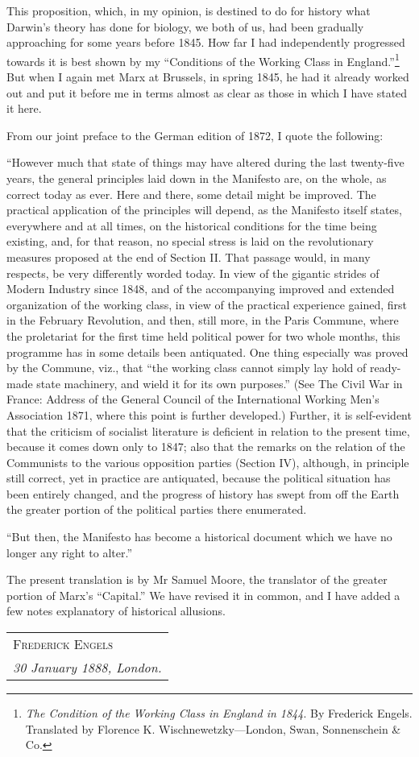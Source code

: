 This proposition, which, in my opinion, is destined to do for history what Darwin's theory has done for biology, we both of us, had been gradually approaching for some years before 1845. How far I had independently progressed towards it is best shown by my ``Conditions of the Working Class in England.''\footnote{\emph{The Condition of the Working Class in England in 1844}. By Frederick Engels. Translated by Florence K. Wischnewetzky—London, Swan, Sonnenschein \& Co.} But when I again met Marx at Brussels, in spring 1845, he had it already worked out and put it before me in terms almost as clear as those in which I have stated it here. 

From our joint preface to the German edition of 1872, I quote the following: 
\begin{displayquote}
``However much that state of things may have altered during the last twenty-five years, the general principles laid down in the Manifesto are, on the whole, as correct today as ever. Here and there, some detail might be improved. The practical application of the principles will depend, as the Manifesto itself states, everywhere and at all times, on the historical conditions for the time being existing, and, for that reason, no special stress is laid on the revolutionary measures proposed at the end of Section II. That passage would, in many respects, be very differently worded today. In view of the gigantic strides of Modern Industry since 1848, and of the accompanying improved and extended organization of the working class, in view of the practical experience gained, first in the February Revolution, and then, still more, in the Paris Commune, where the proletariat for the first time held political power for two whole months, this programme has in some details been antiquated. One thing especially was proved by the Commune, viz., that ``the working class cannot simply lay hold of ready-made state machinery, and wield it for its own purposes.'' (See The Civil War in France: Address of the General Council of the International Working Men's Association 1871, where this point is further developed.) Further, it is self-evident that the criticism of socialist literature is deficient in relation to the present time, because it comes down only to 1847; also that the remarks on the relation of the Communists to the various opposition parties (Section IV), although, in principle still correct, yet in practice are antiquated, because the political situation has been entirely changed, and the progress of history has swept from off the Earth the greater portion of the political parties there enumerated. 

``But then, the Manifesto has become a historical document which we have no longer any right to alter.'' 
\end{displayquote}
The present translation is by Mr Samuel Moore, the translator of the greater portion of Marx's ``Capital.'' We have revised it in common, and I have added a few notes explanatory of historical allusions. 

\hfill
\begin{tabular}{@{}l@{}}
\scshape Frederick Engels \\
\emph{30 January 1888, London.}
\end{tabular}
